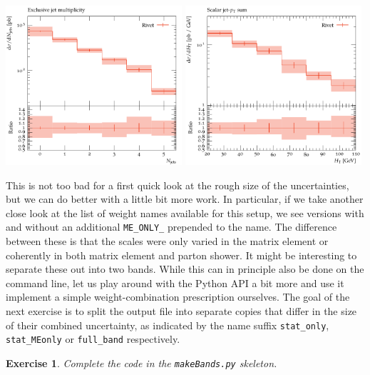 \documentclass[10pt,fleqn]{scrartcl}
\theoremstyle{exstyle}
\newtheorem{exercise}{Exercise}
\begin{document}
\begin{center}
\includegraphics[width=0.49\textwidth]{figures/jets_excl_all_band.pdf}
\includegraphics[width=0.49\textwidth]{figures/HT_all_band.pdf}
\end{center}

This is not too bad for a first quick look at the rough size of the uncertainties,
but we can do better with a little bit more work. 
In particular, if we take another close look at the list of weight names available
for this setup, we see versions with and without an additional \verb|ME_ONLY_| prepended
to the name. The difference between these is that the scales were only varied in
the matrix element or coherently in both matrix element and parton shower.
It might be interesting to separate these out into two bands.
While this can in principle also be done on the command line, let us play around
with the Python API a bit more and use it implement a simple weight-combination
prescription ourselves. The goal of the next exercise is to split the output file
into separate copies that differ in the size of their combined uncertainty,
as indicated by the name suffix \verb|stat_only|, \verb|stat_MEonly| 
or \verb|full_band| respectively.


\begin{exercise}
Complete the code in the \verb|makeBands.py| skeleton.
\end{exercise}
\end{document}
